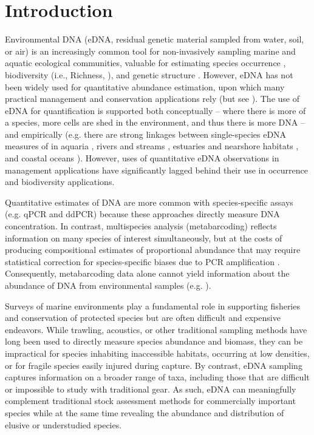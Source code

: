 \documentclass{article}
\begin{document}
\section*{Introduction}
Environmental DNA (eDNA, residual genetic material sampled from water, soil, or air) is an increasingly common tool for non-invasively sampling marine and aquatic ecological communities, valuable for estimating species occurrence \cite{veilleux2021}, biodiversity (i.e., Richness, \cite{muenzel2024}), and genetic structure \cite{andres2023}. However, eDNA has not been widely used for quantitative abundance estimation, upon which many practical management and conservation applications rely (but see \cite{shelton2022,guri2024a,stoeckle2022a}). The use of eDNA for quantification is supported both conceptually -- where there is more of a species, more cells are shed in the environment, and thus there is more DNA -- and empirically (e.g. there are strong linkages between single-species eDNA measures of in aquaria \cite{jo2019b,ledger2024}, rivers and streams \cite{pont2024}, estuaries and nearshore habitats \cite{dibattista2022, baetscher2023}, and coastal oceans \cite{maes2023, shelton2019}). However, uses of quantitative eDNA observations in management applications have significantly lagged behind their use in occurrence and biodiversity applications. 

Quantitative estimates of DNA are more common with species-specific assays (e.g. qPCR and ddPCR) because these approaches directly measure DNA concentration. In contrast, multispecies analysis (metabarcoding) reflects information on many species of interest simultaneously, but at the costs of producing compositional estimates of proportional abundance \cite{gloor2017, mclaren2019} that may require statistical correction for species-specific biases due to PCR amplification \cite{shelton2023}. Consequently, metabarcoding data alone cannot yield information about the abundance of DNA from environmental samples (e.g. \cite{guri2024a}).

Surveys of marine environments play a fundamental role in supporting fisheries and conservation of protected species but are often difficult and expensive endeavors. While trawling, acoustics, or other traditional sampling methods have long been used to directly measure species abundance and biomass, they can be impractical for species inhabiting inaccessible habitats, occurring at low densities, or for fragile species easily injured during capture. By contrast, eDNA sampling captures information on a broader range of taxa, including those that are difficult or impossible to study with traditional gear. As such, eDNA can meaningfully complement traditional stock assessment methods for commercially important species while at the same time revealing the abundance and distribution of elusive or understudied species.
\end{document}
